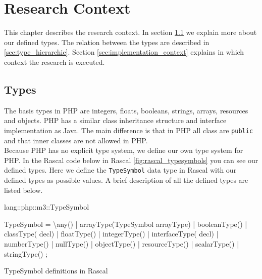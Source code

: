 \documentclass[../main.tex]{subfiles}
\begin{document}
    \chapter{Research Context}\label{ch:inference_design_context}

	This chapter describes the research context.
    In section \ref{sec:types} we explain more about our defined types.
    The relation between the types are described in \ref{sec:type_hierarchie}.
    Section \ref{sec:implementation_context} explains in which context the research is executed.
    
	\section{Types}\label{sec:types}
	The basis types in PHP are integers, floats, booleans, strings, arrays, resources and objects.
	PHP has a similar class inheritance structure and interface implementation as Java.
    The main difference is that in PHP all class are \texttt{public} and that inner classes are not allowed in PHP. 
    \\
	Because PHP has no explicit type system, we define our own type system for PHP.
	In the Rascal code below in Rascal \ref{fig:rascal_typesymbols} you can see our defined types.
	Here we define the \texttt{TypeSymbol} data type in Rascal with our defined types as possible values.
	A brief description of all the defined types are listed below.
	\begin{program}
    \begin{rascal}
 lang::php::m3::TypeSymbol
 
 TypeSymbol
  = \textbackslash{}any()\footnotemark                         {}
  | arrayType(TypeSymbol arrayType) 
  | booleanType()                   
  | classType( decl)             
  | floatType()                     
  | integerType()                   
  | interfaceType( decl)         
  | numberType()                    
  | nullType()                      
  | objectType()                    
  | resourceType()                  
  | scalarType()                    
  | stringType()                    
  ; 
    \end{rascal}
	\caption{TypeSymbol definitions in Rascal}
	\label{fig:rascal_typesymbols}
	\end{program} 
    
\end{document}
